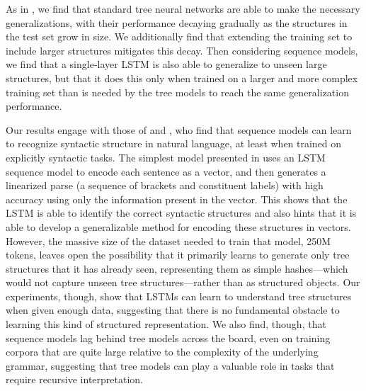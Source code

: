 As in \cite{Bowman:Potts:Manning:2014}, we find that standard tree neural networks are able to make the necessary generalizations, with their performance decaying gradually as the structures in the test set grow in size. We additionally find that extending the training set to include larger structures mitigates this decay. Then considering sequence models, we find that a single-layer LSTM is also able to generalize to unseen large structures, but that it does this only when trained on a larger and more complex training set than is needed by the tree models to reach the same generalization performance.

Our results engage with those of \cite{vinyals2014grammar} and \cite{dyer2015transition}, who find that sequence models can learn to recognize syntactic structure in natural language, at least when trained on explicitly syntactic tasks. The simplest model presented in \cite{vinyals2014grammar} uses an LSTM sequence model to encode each sentence as a vector, and then generates a linearized parse (a sequence of brackets and constituent labels) with high accuracy using only the information present in the vector. This shows that the LSTM is able to identify the correct syntactic structures and also hints that it is able to develop a generalizable method for encoding these structures in vectors. However, the massive size of the dataset needed to train that model, 250M tokens, leaves open the possibility that it primarily learns to generate only tree structures that it has already seen, representing them as simple hashes---which would not capture unseen tree structures---rather than as structured objects.
Our experiments, though, show that LSTMs can learn to understand tree structures when given enough data, suggesting that there is no fundamental obstacle to learning this kind of structured representation. We also find, though, that sequence models lag behind tree models across the board, even on training corpora that are quite large relative to the complexity of the underlying grammar, suggesting that tree models can play a valuable role in tasks that require recursive interpretation.